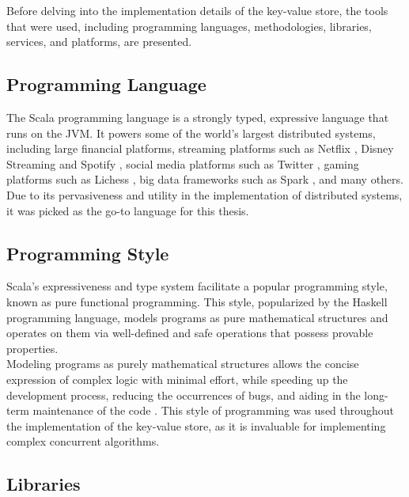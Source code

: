 Before delving into the implementation details of the key-value store, the tools that were used, including programming languages, methodologies, libraries, services, and platforms, are presented.

\subsection{Programming Language}

The Scala programming language is a strongly typed, expressive language that runs on the JVM. It powers some of the world's largest distributed systems, including large financial platforms, streaming platforms such as Netflix \cite{netflix}, Disney Streaming \cite{disney-streaming} and Spotify \cite{spotify}, social media platforms such as Twitter \cite{x-twitter}, gaming platforms such as Lichess \cite{lichess}, big data frameworks such as Spark \cite{spark}, and many others.\\

Due to its pervasiveness and utility in the implementation of distributed systems, it was picked as the go-to language for this thesis.

\subsection{Programming Style}

Scala's expressiveness and type system facilitate a popular programming style, known as pure functional programming. This style, popularized by the Haskell programming language, models programs as pure mathematical structures and operates on them via well-defined and safe operations that possess provable properties.\\

Modeling programs as purely mathematical structures allows the concise expression of complex logic with minimal effort, while speeding up the development process, reducing the occurrences of bugs, and aiding in the long-term maintenance of the code \cite{pure-fp-scala}. This style of programming was used throughout the implementation of the key-value store, as it is invaluable for implementing complex concurrent algorithms.

\subsection{Libraries}

